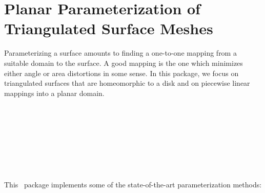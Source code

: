 
\chapter{Planar Parameterization of Triangulated Surface Meshes}
\label{chap:surface_mesh_parameterization_ref}


Parameterizing a surface amounts to finding a one-to-one mapping from
a suitable domain to the surface. A good mapping is the one which
minimizes either angle or area distortions in some sense. In this
package, we focus on triangulated surfaces that are homeomorphic to a
disk and on piecewise linear mappings into a planar domain.



  \\



  \\
  \\
  \\
  \\
  \\



This \cgal\ package implements some of
the state-of-the-art parameterization methods:

